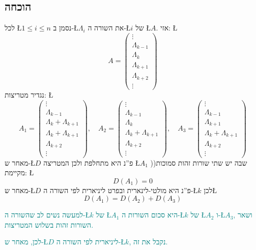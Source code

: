 \documentclass[english,hebrew]{article}
\begin{document}
\subsection{הוכחה}

לכל \L{$1\le i\le n$} נסמן ב-\L{$\Lambda_{i}$} את השורה ה-\L{$i$}
של \L{$A$}. אזי: \L{%
\[
A=\begin{pmatrix}\vdots\\
\Lambda_{k-1}\\
\Lambda_{k}\\
\Lambda_{k+1}\\
\Lambda_{k+2}\\
\vdots
\end{pmatrix}
\]
}%
נגדיר מטריצות: \L{%
\[
A_{1}=\begin{pmatrix}\vdots\\
\Lambda_{k-1}\\
\Lambda_{k}+\Lambda_{k+1}\\
\Lambda_{k}+\Lambda_{k+1}\\
\Lambda_{k+2}\\
\vdots
\end{pmatrix},\quad A_{2}=\begin{pmatrix}\vdots\\
\Lambda_{k-1}\\
\Lambda_{k}\\
\Lambda_{k}+\Lambda_{k+1}\\
\Lambda_{k+2}\\
\vdots
\end{pmatrix},\quad A_{3}=\begin{pmatrix}\vdots\\
\Lambda_{k-1}\\
\Lambda_{k+1}\\
\Lambda_{k}+\Lambda_{k+1}\\
\Lambda_{k+2}\\
\vdots
\end{pmatrix}
\]
}%
מאחר ש-\L{$D$} פ\textquotedblright נ היא מתחלפת ולכן המטריצה \L{$A_{1}$}
)שבה יש שתי שורות זהות סמוכות( מקיימת: \L{%
\[
D(A_{1})=0
\]
}%
מאחר ש-\L{$D$} פ\textquotedblright נ היא מולטי-לינארית ובפרט ליניארית
לפי השורה ה-\L{$k$} לכן\L{%
\[
D(A_{1})=D(A_{2})+D(A_{3})
\]
}%

\textcolor{teal}{למעשה נשים לב שהשורה ה-\L{$k$} של \L{$A_{1}$} היא
סכום השורות ה-\L{$k$} של \L{$A_{2}$} ו-\L{$A_{3}$}, ושאר השורות
זהות בשלוש המטריצות.}

\textcolor{teal}{לכן, מאחר ש-\L{$D$} ליניארית לפי השורה ה-\L{$k$},
נקבל את זה.}\\
\end{document}
